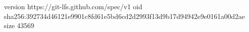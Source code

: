 version https://git-lfs.github.com/spec/v1
oid sha256:392734d46121e9901c8fd61e5bd6cd2d2993f13d9b17d94942e9e0161a00d2ae
size 43569
